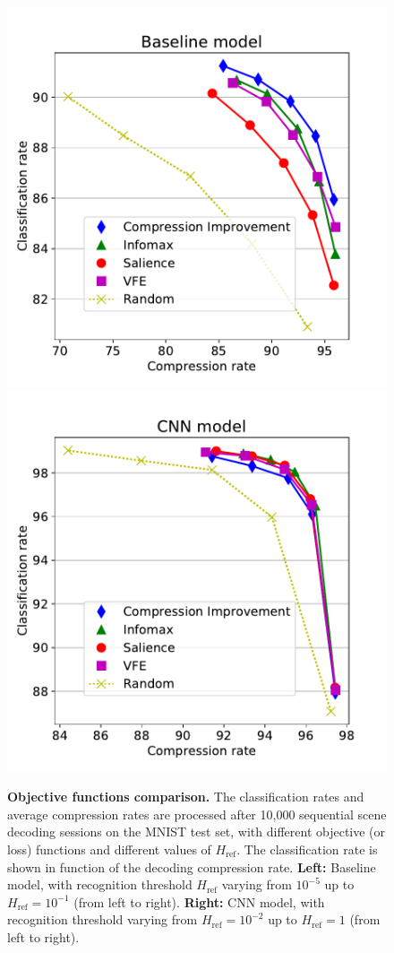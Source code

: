 \documentclass[12pt,twoside,openright]{article}
\begin{document}
\begin{figure}[t!]
	\centerline{
		\includegraphics[width=.5\linewidth]{img/frontiers-classif-base.pdf}
		\includegraphics[width=.5\linewidth]{img/frontiers-classif-CNN.pdf}}
\caption{\textbf{Objective functions comparison.} The classification rates and average compression rates are processed after 10,000 sequential scene decoding sessions on the MNIST test set, with different objective (or loss) functions and different values of $H_\text{ref}$.  The classification rate is shown in function of the decoding compression rate. \textbf{Left:} Baseline model, with recognition threshold $H_\text{ref}$ varying from $10^{-5}$ up to  $H_\text{ref}=10^{-1}$ (from left to right). \textbf{Right:} CNN model, with recognition threshold varying from $H_\text{ref}=10^{-2}$ up to  $H_\text{ref}=1$ (from left to right).}
\label{fig:policy-comp-base}
\end{figure}
\end{document}
